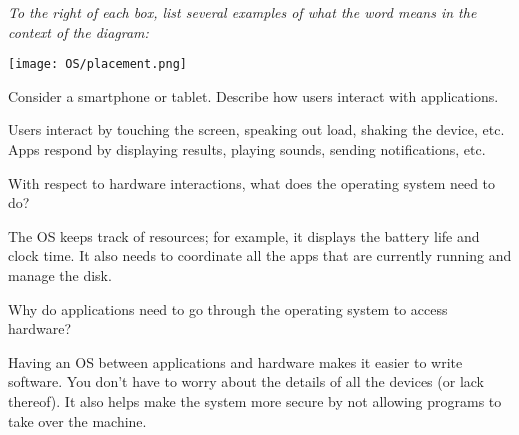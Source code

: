 
\textit{To the right of each box, list several examples of what the word means in the context of the diagram:}

\vspace{1em}

\begin{minipage}{2in}

\texttt{[image: OS/placement.png]}

\end{minipage}
\begin{minipage}{4in}

\vspace{4pt}

\vspace{32pt}

\vspace{32pt}

\vspace{32pt}

\end{minipage}




\Q Consider a smartphone or tablet. Describe how users interact with applications.

\begin{answer}[5em]
Users interact by touching the screen, speaking out load, shaking the device, etc.
Apps respond by displaying results, playing sounds, sending notifications, etc.
\end{answer}


\Q With respect to hardware interactions, what does the operating system need to do?

\begin{answer}[5em]
The OS keeps track of resources; for example, it displays the battery life and clock time.
It also needs to coordinate all the apps that are currently running and manage the disk.
\end{answer}


\Q Why do applications need to go through the operating system to access hardware?

\begin{answer}[5em]
Having an OS between applications and hardware makes it easier to write software.
You don't have to worry about the details of all the devices (or lack thereof).
It also helps make the system more secure by not allowing programs to take over the machine.
\end{answer}
